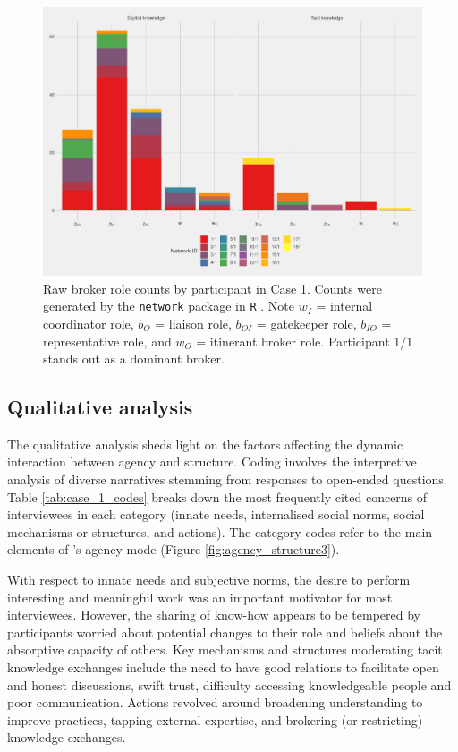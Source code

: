 \begin{figure}
\centering
\includegraphics[width = \textwidth]{Images/gf_case1.pdf}
\caption[Raw broker role counts by participant in Case 1]{Raw broker role counts by participant in Case 1. Counts were generated by the \texttt{network} package in \texttt{R} \citep{butts2008social}. Note $w_I$ = internal coordinator role, $b_O$ = liaison role, $b_{OI}$ = gatekeeper role, $b_{IO}$ = representative role, and $w_O$ = itinerant broker role. Participant 1/1 stands out as a dominant broker.}
\label{fig:gf_c1}
\end{figure}

\subsection{Qualitative analysis}

The qualitative analysis sheds light on the factors affecting the dynamic interaction between agency and structure. Coding involves the interpretive analysis of diverse narratives stemming from responses to open-ended questions. Table \ref{tab:case_1_codes} breaks down the most frequently cited concerns of interviewees in each category (innate needs, internalised social norms, social mechanisms or structures, and actions). The category codes refer to the main elements of \citeauthor{loyal2001agency}'s \citeyearpar{loyal2001agency} agency mode (Figure \ref{fig:agency_structure3}). \medskip

With respect to innate needs and subjective norms, the desire to perform interesting and meaningful work was an important motivator for most interviewees. However, the sharing of know-how appears to be tempered by participants worried about potential changes to their role and beliefs about the absorptive capacity of others. Key mechanisms and structures moderating tacit knowledge exchanges include the need to have good relations to facilitate open and honest discussions, swift trust, difficulty accessing knowledgeable people and poor communication. Actions revolved around broadening understanding to improve practices, tapping external expertise, and brokering (or restricting) knowledge exchanges. 

